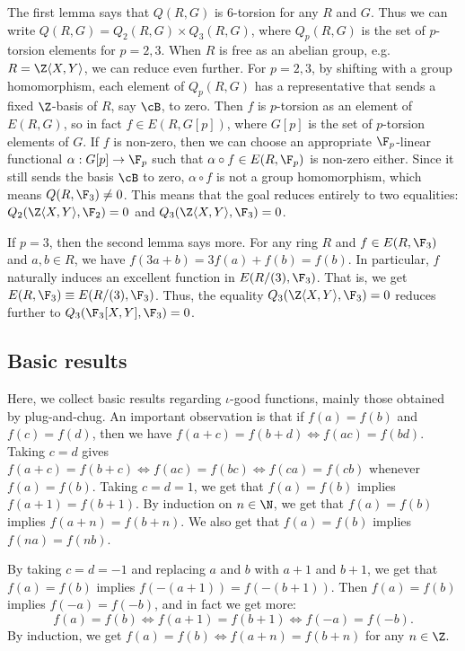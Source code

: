 The first lemma says that $Q(R, G)$ is $6$-torsion for any $R$ and $G$.
Thus we can write $Q(R, G) = Q_2(R, G) \times Q_3(R, G)$, where $Q_p(R, G)$ is the set of $p$-torsion elements for $p = 2, 3$.
When $R$ is free as an abelian group, e.g. $R = \Z \langle X, Y \rangle$, we can reduce even further.
For $p = 2, 3$, by shifting with a group homomorphism, each element of $Q_p(R, G)$ has a representative that sends a fixed $\Z$-basis of $R$, say $\cB$, to zero.
Then $f$ is $p$-torsion as an element of $E(R, G)$, so in fact $f \in E(R, G[p])$, where $G[p]$ is the set of $p$-torsion elements of $G$.
If $f$ is non-zero, then we can choose an appropriate $\F_p$-linear functional $\alpha : G[p] \to \F_p$ such that $\alpha \circ f \in E(R, \F_p)$ is non-zero either.
Since it still sends the basis $\cB$ to zero, $\alpha \circ f$ is not a group homomorphism, which means $Q(R, \F_3) \neq 0$.
This means that the goal reduces entirely to two equalities: $Q_2(\Z \langle X, Y \rangle, \F_2) = 0$ and $Q_3(\Z \langle X, Y \rangle, \F_3) = 0$.

If $p = 3$, then the second lemma says more.
For any ring $R$ and $f \in E(R, \F_3)$ and $a, b \in R$, we have $f(3a + b) = 3 f(a) + f(b) = f(b)$.
In particular, $f$ naturally induces an excellent function in $E(R/(3), \F_3)$.
That is, we get $E(R, \F_3) \equiv E(R/(3), \F_3)$.
Thus, the equality $Q_3(\Z \langle X, Y \rangle, \F_3) = 0$ reduces further to $Q_3(\F_3[X, Y], \F_3) = 0$.





\subsection*{Basic results}

Here, we collect basic results regarding $\iota$-good functions, mainly those obtained by plug-and-chug.
An important observation is that if $f(a) = f(b)$ and $f(c) = f(d)$, then we have $f(a + c) = f (b + d) \iff f(ac) = f(bd)$.
Taking $c = d$ gives $f(a + c) = f(b + c) \iff f(ac) = f(bc) \iff f(ca) = f(cb)$ whenever $f(a) = f(b)$.
Taking $c = d = 1$, we get that $f(a) = f(b)$ implies $f(a + 1) = f(b + 1)$.
By induction on $n \in \N$, we get that $f(a) = f(b)$ implies $f(a + n) = f(b + n)$.
We also get that $f(a) = f(b)$ implies $f(na) = f(nb)$.

By taking $c = d = -1$ and replacing $a$ and $b$ with $a + 1$ and $b + 1$, we get that $f(a) = f(b)$ implies $f(-(a + 1)) = f(-(b + 1))$.
Then $f(a) = f(b)$ implies $f(-a) = f(-b)$, and in fact we get more:
\[ f(a) = f(b) \iff f(a + 1) = f(b + 1) \iff f(-a) = f(-b). \]
By induction, we get $f(a) = f(b) \iff f(a + n) = f(b + n)$ for any $n \in \Z$.


